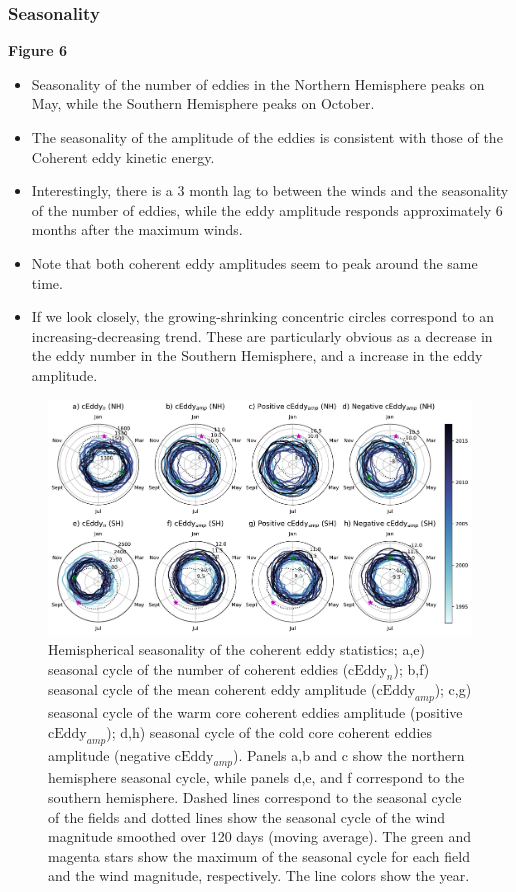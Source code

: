 \documentclass[draft,linenumbers]{agujournal2019}
\newcommand{\cEddy}{\textrm{cEddy}}
\begin{document}
	\subsubsection{Seasonality}

	\textbf{Figure 6}
	\begin{itemize}
		\item Seasonality of the number of eddies in the Northern Hemisphere peaks on May, while the Southern Hemisphere peaks on October. 
		\item The seasonality of the amplitude of the eddies is consistent with those of the Coherent eddy kinetic energy. 
		\item Interestingly, there is a 3 month lag to between the winds and the seasonality of the number of eddies, while the eddy amplitude responds approximately 6 months after the maximum winds. 
		\item Note that both coherent eddy amplitudes seem to peak around the same time. 
		\item If we look closely, the growing-shrinking concentric circles correspond to an increasing-decreasing trend. These are particularly obvious as a decrease in the eddy number in the Southern Hemisphere, and a increase in the eddy amplitude. 
	\end{itemize}

	\begin{figure}
	    \centering
	    \includegraphics[width=1\textwidth]{figures/All_polar_plots_eddy_stats_polarity.pdf}
	    \caption{Hemispherical seasonality of the coherent eddy statistics;
		a,e) seasonal cycle of the number of coherent eddies ($\cEddy_n$); b,f) seasonal cycle of the mean coherent eddy amplitude ($\cEddy_{amp}$); c,g) seasonal cycle of the warm core coherent eddies amplitude (positive $\cEddy_{amp}$); d,h) seasonal cycle of the cold core coherent eddies amplitude (negative $\cEddy_{amp}$). Panels a,b and c show the northern hemisphere seasonal cycle, while panels d,e, and f correspond to the southern hemisphere. Dashed lines correspond to the seasonal cycle of the fields and dotted lines show the seasonal cycle of the wind magnitude smoothed over 120 days (moving average). The green and magenta stars show the maximum of the seasonal cycle for each field and the wind magnitude, respectively. The line colors show the year.}
	    \label{fig:eddy_stats_polar}
	\end{figure}
\end{document}
